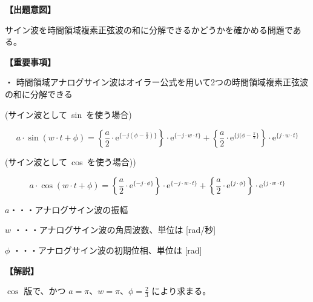 \noindent \textbf{【出題意図】}

\bigskip
\noindent サイン波を時間領域複素正弦波の和に分解できるかどうかを確かめる問題である。

\vspace{1em}
\noindent \textbf{【重要事項】}

\medskip
\noindent ・ 時間領域アナログサイン波はオイラー公式を用いて2つの時間領域複素正弦波の和に分解できる

\medskip
\noindent \mbox{(サイン波として sin を使う場合)}

\[
a \cdot \sin ( w \cdot t + \phi )
=  \left \{ \frac{a}{2} \cdot \textrm{e}^{\{-j (\phi-\frac{\pi}{2}) \}} \right \} \cdot \textrm{e}^{\{-j \cdot w \cdot t \}}
+  \left \{ \frac{a}{2} \cdot \textrm{e}^{\{j (\phi-\frac{\pi}{2} \}} \right \} \cdot \textrm{e}^{\{j \cdot w \cdot t \}}
\]

\medskip
\noindent \mbox{(サイン波として cos を使う場合))}

\[
a \cdot \cos ( w \cdot t + \phi )
=  \left \{ \frac{a}{2} \cdot \textrm{e}^{\{-j \cdot \phi \}} \right \} \cdot \textrm{e}^{\{-j \cdot w \cdot t \}}
+  \left \{ \frac{a}{2} \cdot \textrm{e}^{\{ j \cdot \phi \}} \right \} \cdot \textrm{e}^{\{ j \cdot w \cdot t \}}
\]

\bigskip
\noindent  $a$・・・アナログサイン波の振幅

\bigskip
\noindent $w$ ・・・アナログサイン波の角周波数、単位は [rad/秒]

\bigskip
\noindent $\phi$ ・・・アナログサイン波の初期位相、単位は [rad]

\bigskip

\vspace{1em}
\noindent \textbf{【解説】}

\bigskip

\bigskip
\noindent $\cos$ 版で、かつ $a = \pi$、$w = \pi$、$\phi = \frac{2}{3}$ により求まる。
